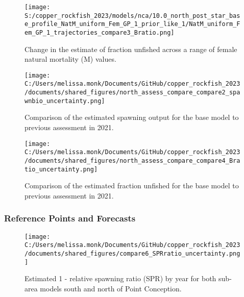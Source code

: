 \documentclass[11pt,
  letterpaper,
]{article}
\begin{document}
\pagebreak

\begin{figure}
{\centering
\texttt{[image: S:/copper\_rockfish\_2023/models/nca/10.0\_north\_post\_star\_base\_profile\_NatM\_uniform\_Fem\_GP\_1\_prior\_like\_1/NatM\_uniform\_Fem\_GP\_1\_trajectories\_compare3\_Bratio.png]}
}
\caption{Change in the estimate of fraction unfished across a range of female natural mortality (M) values.\label{fig:m-depl}}
\end{figure}

\begin{figure}
{\centering
\texttt{[image: C:/Users/melissa.monk/Documents/GitHub/copper\_rockfish\_2023/documents/shared\_figures/north\_assess\_compare\_compare2\_spawnbio\_uncertainty.png]}
}
\caption{Comparison of the estimated spawning output for the base model to previous assessment in 2021.\label{fig:comp-assess-sb}}
\end{figure}

\newpage

\begin{figure}
{\centering
\texttt{[image: C:/Users/melissa.monk/Documents/GitHub/copper\_rockfish\_2023/documents/shared\_figures/north\_assess\_compare\_compare4\_Bratio\_uncertainty.png]}
}
\caption{Comparison of the estimated fraction unfished for the base model to previous assessment in 2021.\label{fig:comp-assess-depl}}
\end{figure}

\newpage

\subsubsection{Reference Points and Forecasts}\label{reference-points-and-forecasts}

\begin{figure}
{\centering
\texttt{[image: C:/Users/melissa.monk/Documents/GitHub/copper\_rockfish\_2023/documents/shared\_figures/compare6\_SPRratio\_uncertainty.png]}
}
\caption{Estimated 1 - relative spawning ratio (SPR) by year for both sub-area models south and north of Point Conception.\label{fig:1-spr}}
\end{figure}
\end{document}
